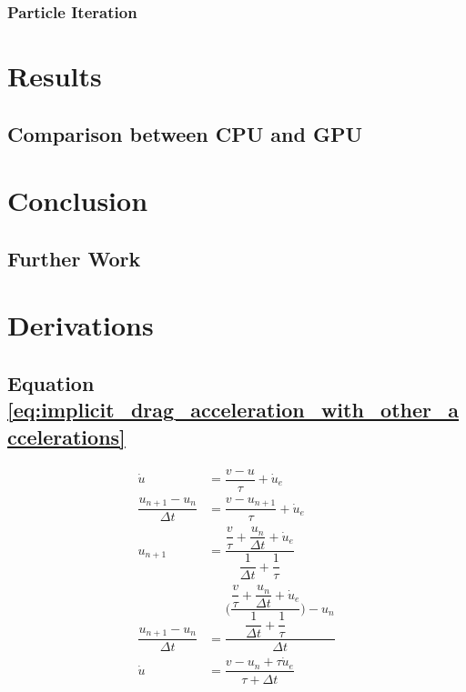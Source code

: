\documentclass[10pt,a4paper,titlepage]{report}
\begin{document}
\subsection{Particle Iteration}
\chapter{Results}
\section{Comparison between CPU and GPU}
\chapter{Conclusion}
\section{Further Work}
\appendix
\chapter{Derivations}
\section{Equation \ref{eq:implicit_drag_acceleration_with_other_accelerations}}
\label{sec:implicit_drag_accel_derivation}
\begin{align}
\dot{u} &= \dfrac{v - u}{\tau} + \dot{u}_{e}
\\\dfrac{u_{n+1} - u_{n}}{\Delta t} &= \dfrac{v - u_{n+1}}{\tau} + \dot{u}_{e}
\\u_{n+1} &= \dfrac{\dfrac{v}{\tau} + \dfrac{u_{n}}{\Delta t} + \dot{u}_{e}}{\dfrac{1}{\Delta t} + \dfrac{1}{\tau}}
\\\dfrac{u_{n+1} - u_{n}}{\Delta t} &= \dfrac{\Bigg(\dfrac{\dfrac{v}{\tau} + \dfrac{u_{n}}{\Delta t} + \dot{u}_{e}}{\dfrac{1}{\Delta t} + \dfrac{1}{\tau}}\Bigg) - u_{n}}{\Delta t}
\\\dot{u} &= \dfrac{v - u_{n} + \tau \dot{u}_{e}}{\tau + \Delta t}
\end{align}


\end{document}

